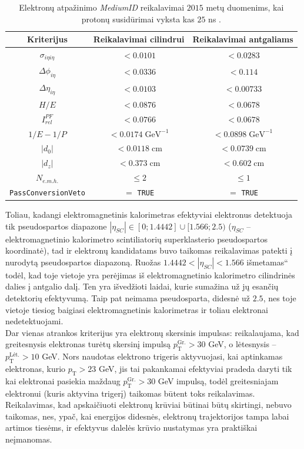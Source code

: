 \documentclass[a4paper, 12pt]{article}
\newcommand{\ltq}[1]{{\quotedblbase{}#1\textquotedblleft{}}}
\newlength\q
\begin{document}
\begin{table}[H]
\centering
\begin{tabular}{|c|c|c|}
\hline
Kriterijus & Reikalavimai cilindrui & Reikalavimai antgaliams \\
\hline \hline
$\sigma_{i\eta i\eta}$ & $<0.0101$ & $<0.0283$ \\
\hline
$\Delta \phi_{i\eta}$ & $<0.0336$ & $<0.114$ \\
\hline
$\Delta\eta_{i\eta}$ & $<0.0103$ & $<0.00733$ \\
\hline
$H/E$ & $<0.0876$ & $<0.0678$ \\
\hline
$I_{rel}^{PF}$ & $<0.0766$ & $<0.0678$ \\
\hline
$1/E-1/P$ & $<0.0174 \; \mathrm{GeV}^{-1}$ & $<0.0898 \; \mathrm{GeV}^{-1}$ \\
\hline
$|d_{0}|$ & $<0.0118 \; \mathrm{cm}$ & $<0.0739 \; \mathrm{cm}$ \\
\hline
$|d_{z}|$ & $<0.373 \; \mathrm{cm}$ & $<0.602 \; \mathrm{cm}$ \\
\hline
$N_{e.m.h.}$ & $\leqslant 2$ & $\leqslant 1$ \\
\hline
\texttt{PassConversionVeto} & $=$ \texttt{TRUE} & $=$ \texttt{TRUE}\\
\hline
\end{tabular}
\caption{\label{table:eleMediumID}Elektronų atpažinimo \textit{MediumID} reikalavimai $2015$ metų duomenims, kai protonų susidūrimai vyksta kas $25$ ns \cite{MediumID2015}.}
\end{table}
Toliau, kadangi elektromagnetinis kalorimetras efektyviai elektronus detektuoja tik pseudospartos diapazone $|\eta_{SC}| \in [0; 1.4442]\cup[1.566; 2.5)$ ($\eta_{SC}$ -- elektromagnetinio kalorimetro scintiliatorių superklasterio pseudospartos koordinatė), tad ir elektronų kandidatams buvo taikomas reikalavimas patekti į nurodytą pseudospartos diapazoną. Ruožas $1.4442<|\eta_{SC}|<1.566$ \ltq{išmetamas} todėl, kad toje vietoje yra perėjimas iš elektromagnetinio kalorimetro cilindrinės dalies į antgalio dalį. Ten yra išvedžioti laidai, kurie sumažina už jų esančių detektorių efektyvumą. Taip pat neimama pseudosparta, didesnė už $2.5$, nes toje vietoje tiesiog baigiasi elektromagnetinis kalorimetras ir toliau elektronai nedetektuojami.\\
Dar vienas atrankos kriterijus yra elektronų skersinis impulsas: reikalaujama, kad greitesnysis elektronas turėtų skersinį impulsą $p_{\mathrm{T}}^{\mathrm{Gr.}}>30$ GeV, o lėtesnysis -- $p_{\mathrm{T}}^{\mathrm{Lėt.}}>10$ GeV. Nors naudotas elektrono trigeris aktyvuojasi, kai aptinkamas elektronas, kurio $p_{\mathrm{T}}>23$ GeV, jis tai pakankamai efektyviai pradeda daryti tik kai elektronai pasiekia maždaug $p_{\mathrm{T}}^{\mathrm{Gr.}}>30$ GeV impulsą, todėl greitesniajam elektronui (kuris aktyvina trigerį) taikomas būtent toks reikalavimas.
Reikalavimas, kad apskaičiuoti elektronų krūviai būtinai būtų skirtingi, nebuvo taikomas, nes, ypač, kai energijos didesnės, elektronų trajektorijos tampa labai artimos tiesėms, ir efektyvus dalelės krūvio nustatymas yra praktiškai neįmanomas.
\end{document}
